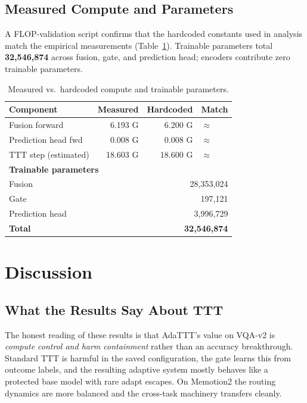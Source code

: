 \documentclass[conference]{IEEEtran}
\begin{document}
\subsection{Measured Compute and Parameters}\label{sec:params}

A FLOP-validation script confirms that the hardcoded constants used in
analysis match the empirical measurements (Table~\ref{tab:flops}).
Trainable parameters total \textbf{32{,}546{,}874} across fusion, gate,
and prediction head; encoders contribute zero trainable parameters.

\begin{table}[!t]
\caption{Measured vs.\ hardcoded compute and trainable parameters.}
\label{tab:flops}
\centering\footnotesize
\begin{tabular}{lrrl}
\toprule
\textbf{Component} & \textbf{Measured} & \textbf{Hardcoded} & \textbf{Match} \\
\midrule
Fusion forward         & 6.193 G & 6.200 G & ${\approx}$ \\
Prediction head fwd    & 0.008 G & 0.008 G & ${\approx}$ \\
TTT step (estimated)   & 18.603 G & 18.600 G & ${\approx}$ \\
\midrule
\multicolumn{4}{l}{\textbf{Trainable parameters}} \\
Fusion                 & \multicolumn{3}{r}{28{,}353{,}024} \\
Gate                   & \multicolumn{3}{r}{197{,}121} \\
Prediction head        & \multicolumn{3}{r}{3{,}996{,}729} \\
\textbf{Total}         & \multicolumn{3}{r}{\textbf{32{,}546{,}874}} \\
\bottomrule
\end{tabular}
\end{table}

\section{Discussion}

\subsection{What the Results Say About TTT}

The honest reading of these results is that AdaTTT's value on VQA-v2 is
\emph{compute control and harm containment} rather than an accuracy
breakthrough. Standard TTT is harmful in the saved configuration, the
gate learns this from outcome labels, and the resulting adaptive system
mostly behaves like a protected base model with rare adapt escapes. On
Memotion2 the routing dynamics are more balanced and the cross-task
machinery transfers cleanly.
\end{document}
